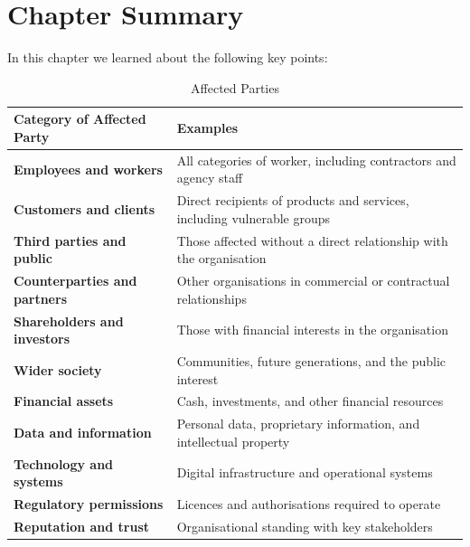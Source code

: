 \section{Chapter Summary}
In this chapter we learned about the following key points:
\begin{table}[H]
  \centering
  \renewcommand{\arraystretch}{1.5}
  \begin{tabularx}{\textwidth}{ | >{\raggedright\arraybackslash}p{} 
                                | >{\raggedright\arraybackslash}X | }
    \hline
    \textbf{Category of Affected Party} & \textbf{Examples} \\
    \hline
    \textbf{Employees and workers} & All categories of worker, including contractors and agency staff\\
    \hline
    \textbf{Customers and clients} & Direct recipients of products and services, including vulnerable groups\\
    \hline
    \textbf{Third parties and public} & Those affected without a direct relationship with the organisation\\
    \hline
    \textbf{Counterparties and partners} & Other organisations in commercial or contractual relationships\\
    \hline
    \textbf{Shareholders and investors} & Those with financial interests in the organisation\\
    \hline
    \textbf{Wider society} & Communities, future generations, and the public interest\\
    \hline
    \textbf{Financial assets} & Cash, investments, and other financial resources\\
    \hline
    \textbf{Data and information} & Personal data, proprietary information, and intellectual property\\
    \hline
    \textbf{Technology and systems} & Digital infrastructure and operational systems\\
    \hline
    \textbf{Regulatory permissions} & Licences and authorisations required to operate\\
    \hline
    \textbf{Reputation and trust} & Organisational standing with key stakeholders\\
    \hline
  \end{tabularx}
  \caption{Affected Parties}
\end{table}


